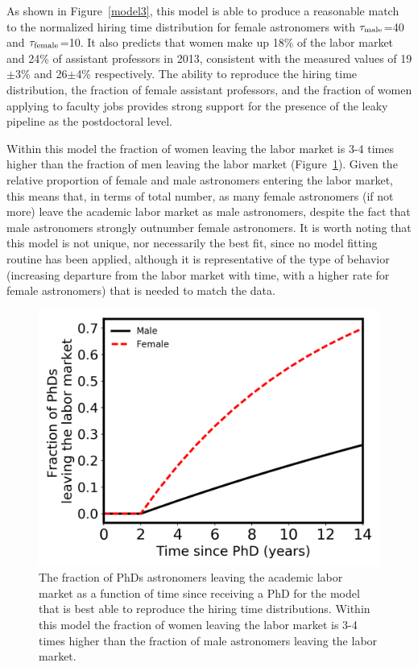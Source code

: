 \documentclass[modern]{aastex62}
\begin{document}
As shown in Figure~\ref{model3}, this model is able to produce a reasonable match to the normalized hiring time distribution for female astronomers with $\tau_{\rm male}$=40 and $\tau_{\rm female}$=10. It also predicts that women make up 18\% of the labor market and 24\% of assistant professors in 2013, consistent with the measured values of 19$\pm$3\% \citep{tho15} and 26$\pm$4\% \citep{hug14} respectively. The ability to reproduce the hiring time distribution, the fraction of female assistant professors, and the fraction of women applying to faculty jobs provides strong support for the presence of the leaky pipeline as the postdoctoral level. 

Within this model the fraction of women leaving the labor market is 3-4 times higher than the fraction of men leaving the labor market (Figure~\ref{df_model3}). Given the relative proportion of female and male astronomers entering the labor market, this means that, in terms of total number, as many female astronomers (if not more) leave the academic labor market as male astronomers, despite the fact that male astronomers strongly outnumber female astronomers. It is worth noting that this model is not unique, nor necessarily the best fit, since no model fitting routine has been applied, although it is representative of the type of behavior (increasing departure from the labor market with time, with a higher rate for female astronomers) that is needed to match the data. 

\begin{figure}[!hbt]
\center
\includegraphics[scale=.6]{df_model3.png}
\caption{The fraction of PhDs astronomers leaving the academic labor market as a function of time since receiving a PhD for the model that is best able to reproduce the hiring time distributions. Within this model the fraction of women leaving the labor market is 3-4 times higher than the fraction of male astronomers leaving the labor market. \label{df_model3}}
\end{figure}
\end{document}
